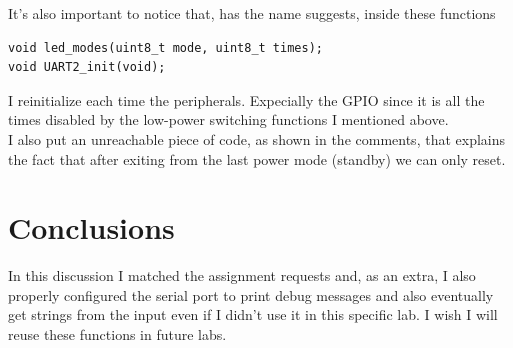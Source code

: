 \documentclass[peerreview]{IEEEtran}
\begin{document}
It's also important to notice that, has the name suggests, inside these functions
\begin{lstlisting}[style=CStyle]
void led_modes(uint8_t mode, uint8_t times);
void UART2_init(void);
\end{lstlisting}
I reinitialize each time the peripherals. Expecially the GPIO since it is all the times disabled by the low-power switching functions I mentioned above.\\
I also put an unreachable piece of code, as shown in the comments, that explains the fact that after exiting from the last power mode (standby) we can only reset.
\label{tab:template}

\section{Conclusions}
In this discussion I matched the assignment requests and, as an extra, I also properly configured the serial port to print debug messages and also eventually get strings from the input even if I didn't use it in this specific lab. I wish I will reuse these functions in future labs.
\end{document}

